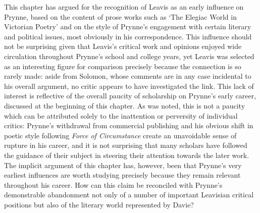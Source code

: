 \documentclass[]{article}
\begin{document}
This chapter has argued for the recognition of Leavis as an early
influence on Prynne, based on the content of prose works such as `The
Elegiac World in Victorian Poetry' and on the style of Prynne's
engagement with certain literary and political issues, most obviously in
his correspondence. This influence should not be surprising given that
Leavis's critical work and opinions enjoyed wide circulation throughout
Prynne's school and college years, yet Leavis was selected as an
interesting figure for comparison precisely because the connection is so
rarely made: aside from Solomon, whose comments are in any case
incidental to his overall argument, no critic appears to have
investigated the link. This lack of interest is reflective of the
overall paucity of scholarship on Prynne's early career, discussed at
the beginning of this chapter. As was noted, this is not a paucity which
can be attributed solely to the inattention or perversity of individual
critics: Prynne's withdrawal from commercial publishing and his obvious
shift in poetic style following \emph{Force of Circumstance} create an
unavoidable sense of rupture in his career, and it is not surprising
that many scholars have followed the guidance of their subject in
steering their attention towards the later work. The implicit argument
of this chapter has, however, been that Prynne's very earliest
influences are worth studying precisely because they remain relevant
throughout his career. How can this claim be reconciled with Prynne's
demonstrable abandonment not only of a number of important Leavisian
critical positions but also of the literary world represented by Davie?
\end{document}
